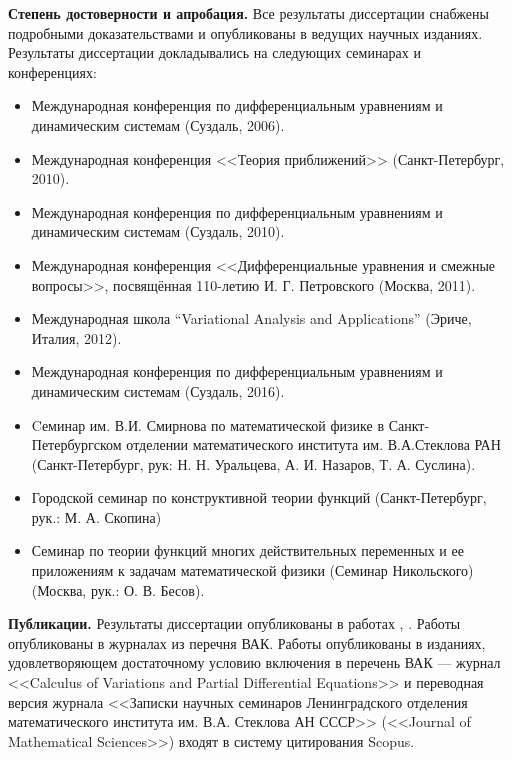 \textbf{Степень достоверности и апробация.}
Все результаты диссертации снабжены подробными доказательствами и опубликованы в ведущих научных изданиях.
Результаты диссертации докладывались на следующих семинарах и конференциях:
\begin{itemize}
    \item
        Международная конференция по дифференциальным уравнениям и динамическим системам (Суздаль, 2006).
    \item
        Международная конференция <<Теория приближений>> (Санкт-Петербург, 2010).
    \item
        Международная конференция по дифференциальным уравнениям и динамическим системам (Суздаль, 2010).
    \item
        Международная конференция <<Дифференциальные уравнения и смежные вопросы>>,
        посвящённая 110-летию И. Г. Петровского (Москва, 2011).
    \item
        Международная школа “Variational Analysis and Applications” (Эриче, Италия, 2012).
    \item
        Международная конференция по дифференциальным уравнениям и динамическим системам (Суздаль, 2016).
    \item
        Cеминар им. В.И. Смирнова по математической физике в Санкт-Петербургском отделении математического института
        им. В.А.Стеклова РАН (Санкт-Петербург, рук: Н. Н. Уральцева, А. И. Назаров, Т. А. Суслина).
    \item
        Городской семинар по конструктивной теории функций (Санкт-Петербург, рук.: М. А. Скопина)
    \item
        Семинар по теории функций многих действительных переменных и ее приложениям к задачам математической физики
        (Семинар Никольского) (Москва, рук.: О. В. Бесов).
\end{itemize}

\textbf{Публикации.}
Результаты диссертации опубликованы в работах \cite{Bankevich2011, Bankevich2015, Bankevich2016, Bankevich2018},
\cite{Suzdal2006, Approximation2010, Suzdal2010, Petrovskii2011, Suzdal2016}.
Работы \cite{Bankevich2011, Bankevich2018} опубликованы в журналах из перечня ВАК.
Работы \cite{Bankevich2015, Bankevich2016} опубликованы в изданиях,
удовлетворяющем достаточному условию включения в перечень ВАК ---
журнал <<Calculus of Variations and Partial Differential Equations>> и переводная версия журнала
<<Записки научных семинаров Ленинградского отделения математического института им. В.А. Стеклова АН СССР>>
(<<Journal of Mathematical Sciences>>) входят в систему цитирования Scopus.

